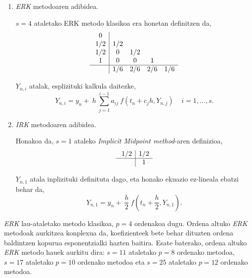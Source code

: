 \begin{enumerate}
\item \emph{ERK} metodoaren adibidea.

$s=4$ ataletako ERK metodo klasikoa era honetan definitzen da, 
\begin{equation*}
\begin{array}{c|cccc}
  \ 0   &    &    &     &      \\
  \ 1/2 & 1/2 &   &     &      \\
  \ 1/2 & 0   & 1/2  &  &      \\
  \ 1   & 0   & 0    &  1   &   \\
  \hline
  \     & 1/6 & 2/6  &  2/6 & 1/6 \\
  \end{array} \\
\end{equation*}

$Y_{n,i}$ atalak, esplizituki kalkula daitezke,
\begin{equation*}
Y_{n,i}=y_n+\ h\ \sum^{i-1}_{j=1}{a_{ij}\ f(t_n+c_jh,Y_{n,j})}\ \ \ \ \ i=1 ,\dots, s.
\end{equation*}  

\item \emph{IRK} metodoaren adibidea.

Honakoa da, $s=1$ ataleko \emph{Implicit Midpoint method}-aren definizioa, 
\begin{equation*}
\begin{array}{c|c}
  \ 1/2 &  1/2\\
  \hline
  \     & 1 \\
\end{array} \\
\end{equation*}

$Y_{n,1}$ atala inplizituki definituta dago, eta honako ekuazio ez-lineala ebatzi behar da,
\begin{equation*}
Y_{n,1}=y_n+\ \frac{h}{2} \ f(t_n+\frac{h}{2},Y_{n,1}).
\end{equation*} 

\end{enumerate}

\emph{ERK} lau-ataletako  metodo klasikoa, $p=4$ ordenakoa dugu. Ordena altuko \emph{ERK} metodoak aurkitzea konplexua da,  koefizienteek bete behar dituzten ordena baldintzen kopurua esponentzialki hazten baitira. Esate baterako, ordena altuko \emph {ERK} metodo hauek aurkitu dira:  $s=11$ ataletako $p=8$ ordenako metodoa,  $s=17$ ataletako $p=10$ ordenako metodoa eta  $s=25$ ataletako $p=12$ ordenako metodoa.
 
